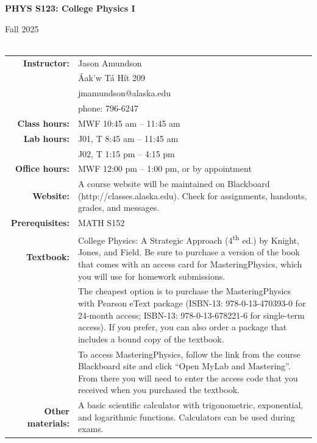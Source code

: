 \documentclass[11pt,letterpaper]{article}
\newcommand{\squeezeup}{\vspace{-2.5mm}}
\newcommand{\tablespace}[0]{\vspace{8pt}}
\begin{document}
\begin{centering}
\textbf{PHYS S123: College Physics I}

Fall 2025\\
\hfill{}\\

\bigskip
\begin{table}[h]
\centering
\setlength{\extrarowheight}{2pt}
\squeezeup
\begin{tabular}{@{}r@{\hspace{0.1in}}p{4.25in}} 
{\bf Instructor:} & Jason Amundson\\
& {\'A}ak'w T{\'a} H{\'i}t 209 \\
& jmamundson@alaska.edu\\
& phone: 796-6247 \tablespace\\
{\bf Class hours:} & MWF 10:45 am -- 11:45 am \tablespace\\
{\bf Lab hours:} & J01, T 8:45 am -- 11:45 am\\
& J02, T 1:15 pm -- 4:15 pm \tablespace\\
{\bf Office hours:} & MWF 12:00 pm -- 1:00 pm, or by appointment\tablespace\\
{\bf Website:} & A course website will be maintained on Blackboard (http://classes.alaska.edu). Check for assignments, handouts, grades, and messages.\tablespace\\
{\bf Prerequisites:} & MATH S152\tablespace\\
{\bf Textbook:} & College Physics: A Strategic Approach (4\textsuperscript{th} ed.) by Knight, Jones, and Field. Be sure to purchase a version of the book that comes with an access card for MasteringPhysics, which you will use for homework submissions.
\tablespace\\
& The cheapest option is to purchase the MasteringPhysics with Pearson eText package (ISBN-13: 978-0-13-470393-0 for 24-month access; ISBN-13: 978-0-13-678221-6 for single-term access). If you prefer, you can also order a package that includes a bound copy of the textbook. 
\tablespace\\
& To access MasteringPhysics, follow the link from the course Blackboard site and click ``Open MyLab and Mastering''. From there you will need to enter the access code that you received when you purchased the textbook.  \tablespace\\
{\bf Other materials:} & A basic scientific calculator with trigonometric, exponential, and logarithmic functions. Calculators can be used during exams.
\end{tabular}
\end{table}
\end{centering}
\end{document}
